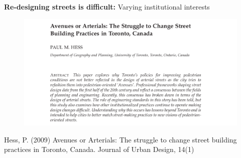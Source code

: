 \documentclass[aspectratio=169]{beamer}
\begin{document}
\begin{frame}
	
	\textbf{Re-designing streets is difficult:} Varying institutional interests
	
	

	\begin{figure}
		\centering
		\includegraphics[width=0.9\linewidth]{images/avenues_or_arterials.png}
	\end{figure}
	
	\tiny{Hess, P. (2009) Avenues or Arterials: The struggle to change street building practices in Toronto, Canada. Journal of Urban Design, 14(1)}
	
\end{frame}
\end{document}
